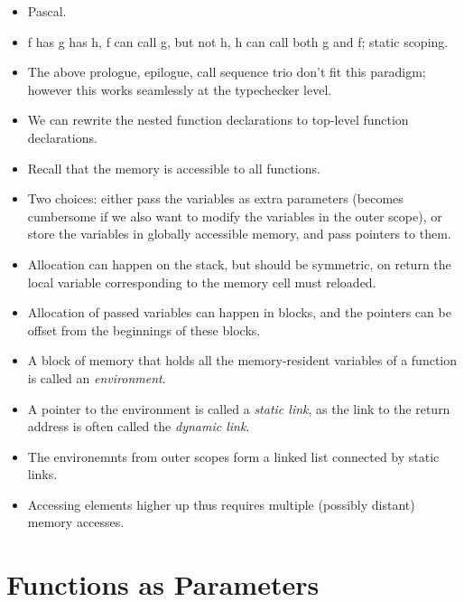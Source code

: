 \begin{itemize}

\item Pascal.

\item f has g has h, f can call g, but not h, h can call both g and f; static
scoping.

\item The above prologue, epilogue, call sequence trio don't fit this paradigm;
however this works seamlessly at the typechecker level.

\item We can rewrite the nested function declarations to top-level function
declarations.

\item Recall that the memory is accessible to all functions.

\item Two choices: either pass the variables as extra parameters (becomes
cumbersome if we also want to modify the variables in the outer scope), or
store the variables in globally accessible memory, and pass pointers to them.

\item Allocation can happen on the stack, but should be symmetric, on return
the local variable corresponding to the memory cell must reloaded.

\item Allocation of passed variables can happen in blocks, and the pointers can
be offset from the beginnings of these blocks.

\item A block of memory that holds all the memory-resident variables of a
function is called an \emph{environment}.

\item A pointer to the environment is called a \emph{static link}, as the link
to the return address is often called the \emph{dynamic link}.

\item The environemnts from outer scopes form a linked list connected by static
links.

\item Accessing elements higher up thus requires multiple (possibly distant)
memory accesses.

\end{itemize}

\section{Functions as Parameters}

